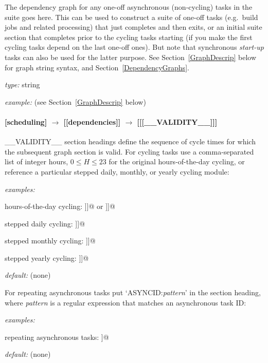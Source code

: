 The dependency graph for any one-off asynchronous (non-cycling) tasks in
the suite goes here. This can be used to construct a suite of one-off
tasks (e.g.\ build jobs and related processing) that just completes and
then exits, or an initial suite section that completes prior to the
cycling tasks starting (if you make the first cycling tasks depend on
the last one-off ones). But note that synchronous {\em start-up} tasks
can also be used for the latter purpose.  See Section~\ref{GraphDescrip}
below for graph string syntax, and Section~\ref{DependencyGraphs}.
\begin{myitemize}
    \item {\em type:} string 
    \item {\em example:} (see Section~\ref{GraphDescrip} below)
\end{myitemize}
 
\paragraph[{[[[}\_\_VALIDITY\_\_{]]]}]{[scheduling] $\rightarrow$ [[dependencies]] $\rightarrow$ [[[\_\_VALIDITY\_\_]]]}

\_\_VALIDITY\_\_ section headings define the sequence of cycle times for
which the subsequent graph section is valid. For cycling tasks use a
comma-separated list of integer hours, $0\leq H \leq 23$ for the original 
hours-of-the-day cycling, or reference a particular stepped daily,
monthly, or yearly cycling module:
\begin{myitemize}
    \item {\em examples:} 
        \begin{myitemize} 
            \item hours-of-the-day cycling: \lstinline@[[[0,6,12,18]]]@ or \lstinline@[[[HoursOfTheDay(0,6,12,18)]]]@ 
            \item stepped daily cycling: \lstinline@[[[Daily(20100823,2)]]]@ 
            \item stepped monthly cycling: \lstinline@[[[Monthly(201008,2)]]]@ 
            \item stepped yearly cycling: \lstinline@[[[Yearly(2010,2)]]]@ 
        \end{myitemize}
    \item {\em default:} (none)
\end{myitemize}
For repeating asynchronous tasks put `ASYNCID:{\em pattern}' in the
section heading, where {\em pattern} is a regular expression that
matches an asynchronous task ID:
\begin{myitemize}
    \item {\em examples:} 
        \begin{myitemize} 
            \item repeating asynchronous tasks: \lstinline@[[ASYNCID:SAT-\d+]]@ 
        \end{myitemize}
    \item {\em default:} (none)
\end{myitemize}

